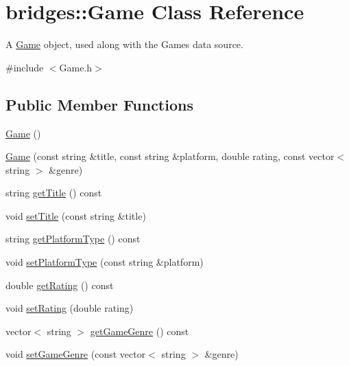 \hypertarget{classbridges_1_1_game}{}\section{bridges\+:\+:Game Class Reference}
\label{classbridges_1_1_game}


A \mbox{\hyperlink{classbridges_1_1_game}{Game}} object, used along with the Games data source.  




{\ttfamily \#include $<$Game.\+h$>$}

\subsection*{Public Member Functions}
\begin{DoxyCompactItemize}
\item 
\mbox{\hyperlink{classbridges_1_1_game_a44f625a03ebf144931aa9e7e5440303c}{Game}} ()
\item 
\mbox{\hyperlink{classbridges_1_1_game_a2cc784203a2e9ab69141eb45714cb5db}{Game}} (const string \&title, const string \&platform, double rating, const vector$<$ string $>$ \&genre)
\item 
string \mbox{\hyperlink{classbridges_1_1_game_af150b6b98fc9ec033873aa6fb3b3f7bb}{get\+Title}} () const
\item 
void \mbox{\hyperlink{classbridges_1_1_game_af5c88115cd037f6d5853fdf1ff79f3a3}{set\+Title}} (const string \&title)
\item 
string \mbox{\hyperlink{classbridges_1_1_game_a450395f308c0f5fec1bfd83295630493}{get\+Platform\+Type}} () const
\item 
void \mbox{\hyperlink{classbridges_1_1_game_aa31882c5e10583faee89379c0e8b9056}{set\+Platform\+Type}} (const string \&platform)
\item 
double \mbox{\hyperlink{classbridges_1_1_game_ac4034068074e006ac6c1fddca6a63791}{get\+Rating}} () const
\item 
void \mbox{\hyperlink{classbridges_1_1_game_a0b9b3180975b2d3028b9090559bb6624}{set\+Rating}} (double rating)
\item 
vector$<$ string $>$ \mbox{\hyperlink{classbridges_1_1_game_a2c335f413572a74d3e645c42ba6ec57a}{get\+Game\+Genre}} () const
\item 
void \mbox{\hyperlink{classbridges_1_1_game_a3096d8ceea27035800b246e59bcb520a}{set\+Game\+Genre}} (const vector$<$ string $>$ \&genre)
\end{DoxyCompactItemize}


